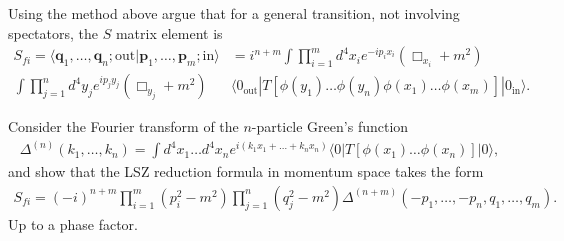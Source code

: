 \documentclass[working, oneside]{../../Preambles/tuftebook}
\begin{document}
\begin{exercise}[10]
Using the method above argue that for a general transition, not involving spectators, the $S$ matrix element is
\begin{align*}
    S_{fi} = \langle \mathbf{q}_1, \dots, \mathbf{q}_n; \text{out} | \mathbf{p}_1, \dots, \mathbf{p}_m; \text{in} \rangle &= i^{n+m} \int \prod_{i=1}^m d^4x_i e^{-ip_i x_i} (\Box_{x_i} + m^2) \\ \int \prod_{j=1}^n d^4y_j e^{ip_j y_j} (\Box_{y_j} + m^2) &\langle 0_{\text{out}} | T \left[ \phi(y_1) \dots \phi(y_n) \phi(x_1) \dots \phi(x_m) \right] | 0_{\text{in}} \rangle. \tag{98}
\end{align*}
\end{exercise}

\begin{exercise}[11]
Consider the Fourier transform of the $n$-particle Green's function
\begin{align*}
\Delta^{(n)}(k_1, \dots, k_n) = \int d^4x_1 \dots d^4x_n e^{i(k_1 x_1 + \dots + k_n x_n)} \langle 0 | T \left[ \phi(x_1) \dots \phi(x_n) \right] | 0 \rangle, \tag{99}
\end{align*}
and show that the LSZ reduction formula in momentum space takes the form
\begin{align*}
S_{fi} = (-i)^{n+m} \prod_{i=1}^m (p_i^2 - m^2) \prod_{j=1}^n (q_j^2 - m^2) \Delta^{(n+m)}(-p_1, \dots, -p_n, q_1, \dots, q_m). \tag{100}
\end{align*}
Up to a phase factor.
\end{exercise}
\end{document}

